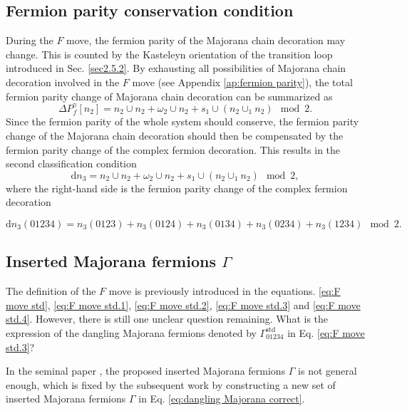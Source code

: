 \documentclass[%
 reprint,
 amsmath,amssymb,
 aps,
prb,
]{revtex4-2}
\begin{document}
\subsection{Fermion parity conservation condition}

During the $F$ move, the fermion parity of the Majorana chain decoration may change.
This is counted by the Kasteleyn orientation of the transition loop introduced in Sec. \ref{sec2.5.2}.
By exhausting all possibilities of Majorana chain decoration involved in the $F$ move (see Appendix \ref{ap:fermion parity}), the total fermion parity change of Majorana chain decoration can be summarized as 
\begin{equation}
\Delta P^{\gamma}_f[n_2] = n_2 \cup n_2 + \omega_2 \cup n_2 + s_1 \cup (n_2 \cup_1 n_2) \mod 2 .\label{eq:fermion parity change F move}
\end{equation}
Since the fermion parity of the whole system should conserve, the fermion parity change of the Majorana chain decoration should then be compensated by the fermion parity change of the complex fermion decoration.
This results in the second classification condition 
\begin{equation}
\mathrm d n_3 = n_2 \cup n_2 + \omega_2 \cup n_2 + s_1 \cup (n_2 \cup_1 n_2) \mod 2 ,\label{eq:parity conservation}
\end{equation}
where the right-hand side is the fermion parity change of the complex fermion decoration 
\begin{widetext}
\begin{equation}
\mathrm d n_3(01234) = n_3(0123) + n_3(0124) + n_3(0134) + n_3(0234) + n_3(1234) \mod 2 .
\end{equation}
\end{widetext}


\subsection{Inserted Majorana fermions $\Gamma$} \label{sec3.4.1}

The definition of the $F$ move is previously introduced in the equations. \eqref{eq:F move std}, \eqref{eq:F move std.1}, \eqref{eq:F move std.2}, \eqref{eq:F move std.3} and \eqref{eq:F move std.4}.
However, there is still one unclear question remaining. What is the expression of the dangling Majorana fermions denoted by $\Gamma_{01234}^{\mathrm{std}}$ in Eq. \eqref{eq:F move std.3}?

In the seminal paper \cite{Wang2020}, the proposed inserted Majorana fermions $\Gamma$ is not general enough, which is fixed by the subsequent work \cite{Ning2025unpub} by constructing a new set of inserted Majorana fermions $\Gamma$ in Eq. \eqref{eq:dangling Majorana correct}.
\end{document}
